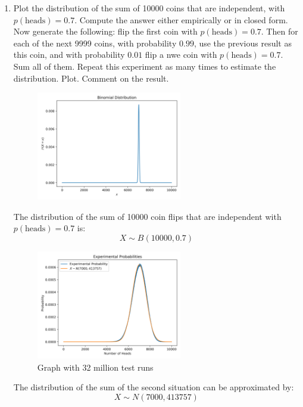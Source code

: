 \documentclass[10pt,\jkfside,a4paper]{article}
\begin{document}
\begin{enumerate}
\item

Plot the distribution of the sum of 10000 coins that are independent,
with $p(\text{heads}) = 0.7$.
Compute the answer either empirically or in closed form.
Now generate the following: flip the first coin with $p(\text{heads}) = 0.7$.
Then for each of the next 9999 coins, with probability $0.99$, use the previous result as this coin,
and with probability $0.01$ flip a nwe coin with $p(\text{heads}) = 0.7$.
Sum all of them.
Repeat this experiment as many times to estimate the distribution.
Plot.
Comment on the result.

\begin{figure}[H]
\centering
\includegraphics[width=0.6\textwidth]{normabinomial}
\end{figure}

The distribution of the sum of 10000 coin flips that are independent with $p(\text{heads}) = 0.7$ is:
\[
X \sim B(10000, 0.7)
\]

\begin{figure}[H]
\centering
\includegraphics[width=0.6\textwidth]{experimental_prob}
\caption{Graph with 32 million test runs}
\end{figure}

The distribution of the sum of the second situation can be approximated by:
\[
X \sim N(7000, 413757)
\]


\end{enumerate}
\end{document}
